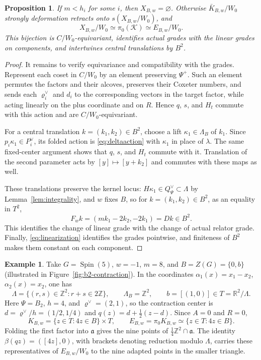 \documentclass[11pt,a4paper,reqno]{amsart}
\theoremstyle{plain}
\newtheorem{proposition}[theorem]{Proposition}
\theoremstyle{definition}
\newtheorem{example}[theorem]{Example}
\theoremstyle{remark}
\numberwithin{equation}{section}
\newcommand{\ZZ}{\mathbb Z}
\newcommand{\RR}{\mathbb R}
\newcommand{\fa}{\mathfrak a}
\newcommand{\rh}{\varrho^\vee}
\begin{document}
\begin{proposition}\label{prop:contraction} If $m<h_i$ for some $i$, then $X_{B,w}=\varnothing$. Otherwise $\bar K_{B,w}/W_0$ strongly deformation retracts onto $s(X_{B,w}/W_0)$, and
\begin{equation}\label{eq:44}
X_{B,w}/W_0\simeq\pi_0(\mathcal K)\simeq E_{B,w}/W_0.
\end{equation}
This bijection is $C/W_0$-equivariant, identifies actual grades with the linear grades on components, and intertwines central translations by $B^2$.
\end{proposition}
\begin{proof}
It remains to verify equivariance and compatibility with the grades. Represent each coset in $C/W_0$ by an element preserving $\Psi^+$. Such an element permutes the factors and their alcoves, preserves their Coxeter numbers, and sends each $\rh_i$ and $d_i$ to the corresponding vectors in the target factor, while acting linearly on the plus coordinate and on $R$. Hence $q$, $s$, and $H_t$ commute with this action and are $C/W_0$-equivariant.

For a central translation $k=(k_1,k_2)\in B^2$, choose a lift $\kappa_1\in\Lambda_B$ of $k_1$. Since $p_i\kappa_1\in P_i^\vee$, its folded action is \eqref{eq:deltaaction} with $\kappa_1$ in place of $\lambda$. The same fixed-center argument shows that $q$, $s$, and $H_t$ commute with it. Translation of the second parameter acts by $[y]\mapsto[y+k_2]$ and commutes with these maps as well.

These translations preserve the kernel locus: $H\kappa_1\in Q_\Psi^\vee\subset\Lambda$ by Lemma~\ref{lem:integrality}, and $w$ fixes $B$, so for $k=(k_1,k_2)\in B^2$, as an equality in $T^2$,
\begin{equation}\label{eq:FD}
F_wk=(mk_1-2k_2,-2k_1)=Dk\in B^2.
\end{equation}
This identifies the change of linear grade with the change of actual relator grade. Finally, \eqref{eq:linearization} identifies the grades pointwise, and finiteness of $B^2$ makes them constant on each component.
\end{proof}

\begin{example}\label{ex:b2-contraction}
Take $G=\operatorname{Spin}(5)$, $w=-1$, $m=8$, and $B=Z(G)=\{0,b\}$ (illustrated in Figure~\ref{fig:b2-contraction}). In the coordinates $\alpha_1(x)=x_1-x_2$, $\alpha_2(x)=x_2$, one has
\[
\Lambda=\{(r,s)\in\ZZ^2:r+s\in2\ZZ\},\qquad \Lambda_B=\ZZ^2,\qquad b=[(1,0)]\in T=\RR^2/\Lambda.
\]
Here $\Psi=B_2$, $h=4$, and $\rh=(2,1)$, so the contraction center is $d=\rh/h=(1/2,1/4)$ and $q(z)=d+\tfrac12(z-d)$. Since $A=0$ and $R=0$,
\[
K_{B,w}=\{z\in T:4z\in B\}\times T,\qquad E_{B,w}=\pi_0K_{B,w}\simeq\{z\in T:4z\in B\}.
\]
Folding the first factor into $\fa$ gives the nine points of $\tfrac14\ZZ^2\cap\fa$. The identity $\beta(qz)=([4z],0)$, with brackets denoting reduction modulo $\Lambda$, carries these representatives of $E_{B,w}/W_0$ to the nine adapted points in the smaller triangle.
\end{example}
\end{document}
